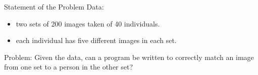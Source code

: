 \documentclass[pdf]{beamer}
\begin{document}

\begin{frame}{Statement of the Problem}
Data:
\begin{itemize}
\item two sets of 200 images taken of 40 individuals.
\item each individual has five different images in each set.
\end{itemize}
Problem: Given the data, can a program be written to correctly match an image from one set to a person in the other set?
\end{frame}
\end{document}
